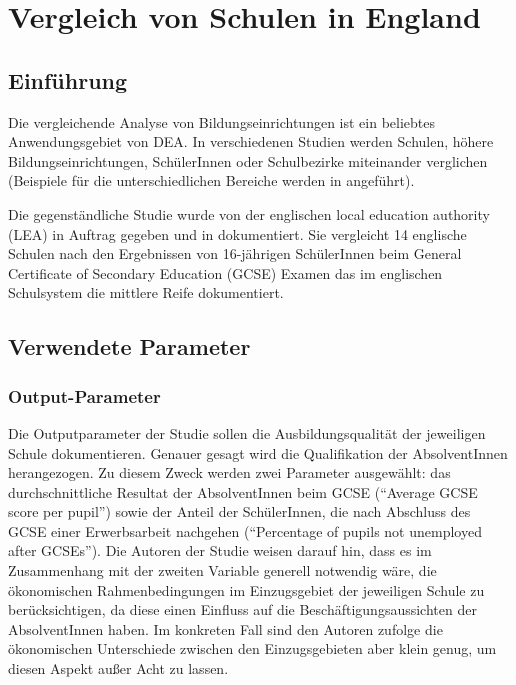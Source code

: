 \section{Vergleich von Schulen in England}
\subsection{Einführung}
Die vergleichende Analyse von Bildungseinrichtungen ist ein beliebtes Anwendungsgebiet von DEA.
In verschiedenen Studien werden Schulen, höhere Bildungseinrichtungen, SchülerInnen oder Schulbezirke miteinander verglichen (Beispiele für die unterschiedlichen Bereiche werden in \cite*[S.77]{fried_measurement_2008} angeführt).

Die gegenständliche Studie wurde von der englischen local education authority (LEA) in Auftrag gegeben und in \cite{thanassoulis_guiding_1994} dokumentiert.
Sie vergleicht 14 englische Schulen nach den Ergebnissen von 16-jährigen SchülerInnen beim General Certificate of Secondary Education (GCSE) Examen das im englischen Schulsystem die mittlere Reife dokumentiert.

\subsection{Verwendete Parameter}
\subsubsection{Output-Parameter}
Die Outputparameter der Studie sollen die Ausbildungsqualität der jeweiligen Schule dokumentieren.
Genauer gesagt wird die Qualifikation der AbsolventInnen herangezogen.
Zu diesem Zweck werden zwei Parameter ausgewählt: das durchschnittliche Resultat der AbsolventInnen beim GCSE ("`Average GCSE score per pupil"') sowie der Anteil der SchülerInnen, die nach Abschluss des GCSE einer Erwerbsarbeit nachgehen ("`Percentage of pupils not unemployed after GCSEs"').
Die Autoren der Studie weisen darauf hin, dass es im Zusammenhang mit der zweiten Variable generell notwendig wäre, die ökonomischen Rahmenbedingungen im Einzugsgebiet der jeweiligen Schule zu berücksichtigen, da diese einen Einfluss auf die Beschäftigungsaussichten der AbsolventInnen haben.
Im konkreten Fall sind den Autoren zufolge die ökonomischen Unterschiede zwischen den Einzugsgebieten aber klein genug, um diesen Aspekt außer Acht zu lassen.

